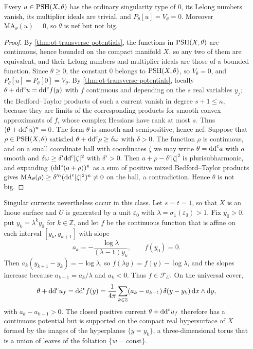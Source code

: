 \begin{corollary}\label{cor:ot-no-singular-potentials}
Every $u\in\mathrm{PSH}(X,\theta)$ has the ordinary singularity type of $0$, its Lelong numbers vanish, its multiplier ideals are trivial, and $P_\theta[u]=V_\theta=0$. Moreover $\mathrm{MA}_\theta(u)=0$, so $\theta$ is nef but not big.
\end{corollary}
\begin{proof}
By \cref{thm:ot-transverse-potentials}, the functions in $\mathrm{PSH}(X,\theta)$ are continuous, hence bounded on the compact manifold $X$, so any two of them are equivalent, and their Lelong numbers and multiplier ideals are those of a bounded function. Since $\theta\geq0$, the constant $0$ belongs to $\mathrm{PSH}(X,\theta)$, so $V_\theta=0$, and $P_\theta[u]=P_\theta[0]=V_\theta$. By \cref{thm:ot-transverse-potentials}, locally $\theta+\mathrm{dd}^{\mathrm{c}} u=\mathrm{dd}^{\mathrm{c}} f(y)$ with $f$ continuous and depending on the $s$ real variables $y_j$; the Bedford--Taylor products of such a current vanish in degree $s+1\leq n$, because they are limits of the corresponding products for smooth convex approximants of $f$, whose complex Hessians have rank at most $s$. Thus $(\theta+\mathrm{dd}^{\mathrm{c}} u)^n=0$. The form $\theta$ is smooth and semipositive, hence nef. Suppose that $\rho\in\mathrm{PSH}(X,\theta)$ satisfied $\theta+\mathrm{dd}^{\mathrm{c}}\rho\geq\delta\omega$ with $\delta>0$. The function $\rho$ is continuous, and on a small coordinate ball with coordinates $\zeta$ we may write $\theta=\mathrm{dd}^{\mathrm{c}} a$ with $a$ smooth and $\delta\omega\geq\delta'\mathrm{dd}^{\mathrm{c}}|\zeta|^2$ with $\delta'>0$. Then $a+\rho-\delta'|\zeta|^2$ is plurisubharmonic, and expanding $(\mathrm{dd}^{\mathrm{c}}(a+\rho))^n$ as a sum of positive mixed Bedford--Taylor products gives $\mathrm{MA}_\theta(\rho)\geq\delta'^n(\mathrm{dd}^{\mathrm{c}}|\zeta|^2)^n\neq0$ on the ball, a contradiction. Hence $\theta$ is not big.
\end{proof}

Singular currents nevertheless occur in this class. Let $s=t=1$, so that $X$ is an Inoue surface and $U$ is generated by a unit $\varepsilon_0$ with $\lambda=\sigma_1(\varepsilon_0)>1$. Fix $y_0>0$, put $y_k=\lambda^ky_0$ for $k\in\mathbb Z$, and let $f$ be the continuous function that is affine on each interval $[y_k,y_{k+1}]$ with slope
\[
 a_k=-\frac{\log\lambda}{(\lambda-1)y_k},
 \qquad f(y_0)=0.
\]
Then $a_k(y_{k+1}-y_k)=-\log\lambda$, so $f(\lambda y)=f(y)-\log\lambda$, and the slopes increase because $a_{k+1}=a_k/\lambda$ and $a_k<0$. Thus $f\in\mathcal F_U$. On the universal cover,
\[
 \theta+\mathrm{dd}^{\mathrm{c}} u_f=\mathrm{dd}^{\mathrm{c}} f(y)=\frac1{4\pi}\sum_{k\in\mathbb Z}(a_k-a_{k-1})\,
       \delta(y-y_k)\,\mathrm dx\wedge\mathrm dy,
\]
with $a_k-a_{k-1}>0$. The closed positive current $\theta+\mathrm{dd}^{\mathrm{c}} u_f$ therefore has a continuous potential but is supported on the compact real hypersurface of $X$ formed by the images of the hyperplanes $\{y=y_k\}$, a three-dimensional torus that is a union of leaves of the foliation $\{w=\text{const}\}$.

